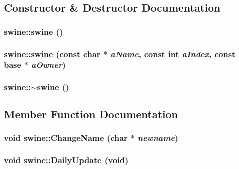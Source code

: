 \subsection{Constructor \& Destructor Documentation}
\hypertarget{classswine_a596ba6b6d36fb9674efb9af20138269b}{
\subsubsection[{swine}]{\setlength{\rightskip}{0pt plus 5cm}swine::swine ()}}
\label{classswine_a596ba6b6d36fb9674efb9af20138269b}
\hypertarget{classswine_ade28c6b738f570b312d65c7646dd23bf}{
\subsubsection[{swine}]{\setlength{\rightskip}{0pt plus 5cm}swine::swine (const char $\ast$ {\em aName}, \/  const int {\em aIndex}, \/  const {\bf base} $\ast$ {\em aOwner})}}
\label{classswine_ade28c6b738f570b312d65c7646dd23bf}
\hypertarget{classswine_ae27fca38d2543b633e9f1407a47bbe3e}{
\subsubsection[{$\sim$swine}]{\setlength{\rightskip}{0pt plus 5cm}swine::$\sim$swine ()}}
\label{classswine_ae27fca38d2543b633e9f1407a47bbe3e}


\subsection{Member Function Documentation}
\hypertarget{classswine_aa53f35964f2b752022d2f413590a99b0}{
\subsubsection[{ChangeName}]{\setlength{\rightskip}{0pt plus 5cm}void swine::ChangeName (char $\ast$ {\em newname})}}
\label{classswine_aa53f35964f2b752022d2f413590a99b0}
\hypertarget{classswine_aa5b1551767e9bc33a2dad33ef32627fb}{
\subsubsection[{DailyUpdate}]{\setlength{\rightskip}{0pt plus 5cm}void swine::DailyUpdate (void)}}
\label{classswine_aa5b1551767e9bc33a2dad33ef32627fb}


